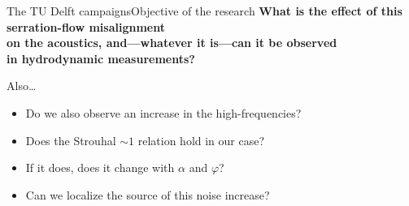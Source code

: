 \documentclass[xcolor=table,aspectratio=169]{beamer}
\makeatletter
\newenvironment{backgroundblock}[2]{%
  \global\setbox\@backgroundblock=\vbox\bgroup%
    \unvbox\@backgroundblock%
    \vbox to0pt\bgroup\vskip#2\hbox to0pt\bgroup\hskip#1\relax%
}{\egroup\egroup\egroup}
\makeatother
\begin{document}

\begin{frame}{The TU Delft campaigns}{Objective of the research}
    \vspace{1.0cm}
    \textcolor{LMBlue}{\bf What is the effect of this serration-flow misalignment\\on the acoustics, and---whatever it is---can it be observed \\in hydrodynamic measurements?}

    \vspace{0.5cm}

    Also\dots
    \begin{itemize}
        \item Do we also observe an \textcolor{LMLightBlue}{increase in the high-frequencies}?
        \item Does the \textcolor{LMLightBlue}{Strouhal $\sim 1$} relation hold in our case?
        \item If it does, \textcolor{LMLightBlue}{does it change} with $\alpha$ and $\varphi$?
        \item Can we \textcolor{LMLightBlue}{localize the source} of this noise increase?
    \end{itemize}
\end{frame}
\end{document}
